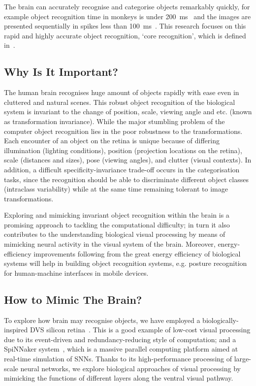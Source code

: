 \documentclass[journal]{journal}
\begin{document}
The brain can accurately recognise and categorise objects remarkably quickly, for example object recognition time in monkeys is under 200~ms~\cite{fabre1998rapid} and the images are presented sequentially in spikes less than 100~ms~\cite{keysers2001speed}.
This research focuses on this rapid and highly accurate object recognition, `core recognition', which is defined in~\cite{dicarlo2007untangling}.


\subsection{Why Is It Important?}
\label{sec:imp}
The human brain recognises huge amount of objects rapidly with ease even in cluttered and natural scenes.
This robust object recognition of the biological system is invariant to the change of position, scale, viewing angle and etc. (known as transformation invariance).
While the major stumbling problem of the computer object recognition lies in the poor robustness to the transformations.
Each encounter of an object on the retina is unique because of differing illumination (lighting conditions), position (projection locations on the retina), scale (distances and sizes), pose (viewing angles), and clutter (visual contexts).
In addition, a difficult specificity-invariance trade-off occurs in the categorisation tasks, since the recognition should be able to discriminate different object classes (intraclass variability) while at the same time remaining tolerant to image transformations.   

Exploring and mimicking invariant object recognition within the brain is a promising approach to tackling the computational difficulty;
in turn it also contributes to the understanding biological visual processing by means of mimicking neural activity in the visual system of the brain.
Moreover, energy-efficiency improvements following from the great energy efficiency of biological systems will help in building object recognition systems, e.g. posture recognition for human-machine interfaces in mobile devices.  

\subsection{How to Mimic The Brain?}
\label{sec:brn}
To explore how brain may recognise objects, we have employed a biologically-inspired DVS silicon retina~\cite{lenero20113}.
This is a good example of low-cost visual processing due to its event-driven and redundancy-reducing style of computation;
and a SpiNNaker system~\cite{furber2014spinnaker}, which is a massive parallel computing platform aimed at real-time simulation of SNNs. 
Thanks to its high-performance processing of large-scale neural networks, we explore biological approaches of visual processing by mimicking the functions of different layers along the ventral visual pathway. 
\end{document}
